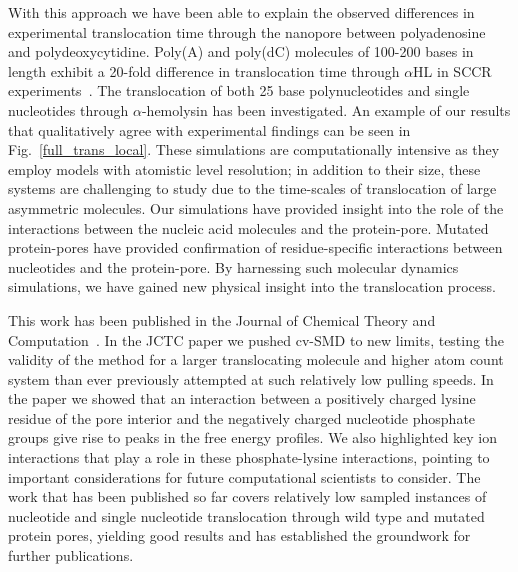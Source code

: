 \documentclass[a4paper,10pt]{article}
\newcommand{\ahl}{$\alpha$HL }
\begin{document}
With this approach we have been able to explain the observed differences in experimental translocation time through the nanopore between polyadenosine and polydeoxycytidine. Poly(A) and poly(dC) molecules of 100-200 bases in length exhibit a 20-fold difference in translocation time through \ahl in SCCR experiments~\cite{akeson}. The translocation of both 25 base polynucleotides and single nucleotides through $\alpha$-hemolysin has been investigated. An example of our results that qualitatively agree with experimental findings can be seen in Fig.~\ref{full_trans_local}. These simulations are computationally intensive as they employ models with atomistic level resolution; in addition to their size, these systems are challenging to study due to the time-scales of translocation of large asymmetric molecules. Our simulations have provided insight into the role of the interactions between the nucleic acid molecules and the protein-pore. Mutated protein-pores have provided confirmation of residue-specific interactions between nucleotides and the protein-pore. By harnessing such molecular dynamics simulations, we have gained new physical insight into the translocation process.

This work has been published in the Journal of Chemical Theory and Computation~\cite{martin-determination}.  In the JCTC paper we pushed cv-SMD to new limits, testing the validity of the method for a larger translocating molecule and higher atom count system than ever previously attempted at such relatively low pulling speeds. In the paper we showed that an interaction between a positively charged lysine residue of the pore interior and the negatively charged nucleotide phosphate groups give rise to peaks in the free energy profiles. We also highlighted key ion interactions that play a role in these phosphate-lysine interactions, pointing to important considerations for future computational scientists to consider. The work that has been published so far covers relatively low sampled instances of nucleotide and single nucleotide translocation through wild type and mutated protein pores, yielding good results and has established the groundwork for further publications. 
\end{document}
